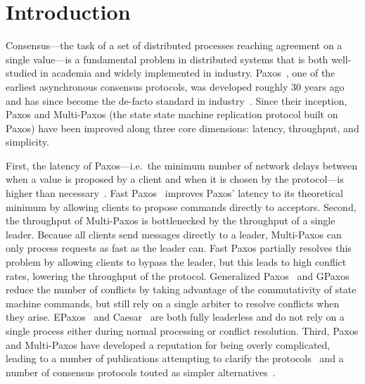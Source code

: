 \section{Introduction}


Consensus---the task of a set of distributed processes reaching agreement on a
single value---is a fundamental problem in distributed systems that is both
well-studied in academia and widely implemented in industry.
Paxos~\cite{lamport1998part}, one of the earliest asynchronous consensus
protocols, was developed roughly 30 years ago and has since become the de-facto
standard in industry~\cite{burrows2006chubby, chandra2007paxos,
baker2011megastore, corbett2013spanner}. Since their inception, Paxos and
Multi-Paxos (the state state machine replication protocol built on Paxos) have
been improved along three core dimensions: latency, throughput, and simplicity.

First, the latency of Paxos---i.e.\ the minimum number of network delays
between when a value is proposed by a client and when it is chosen by the
protocol---is higher than necessary~\cite{lamport2006lower}. Fast
Paxos~\cite{lamport2006fast} improves Paxos' latency to its theoretical minimum
by allowing clients to propose commands directly to acceptors.
%
Second, the throughput of Multi-Paxos is bottlenecked by the throughput of a
single leader. Because all clients send messages directly to a leader,
Multi-Paxos can only process requests as fast as the leader can. Fast Paxos
partially resolves this problem by allowing clients to bypass the leader, but
this leads to high conflict rates, lowering the throughput of the protocol.
Generalized Paxos~\cite{lamport2005generalized} and GPaxos~\cite{sutra2011fast}
reduce the number of conflicts by taking advantage of the commutativity of
state machine commands, but still rely on a single arbiter to resolve conflicts
when they arise. EPaxos~\cite{moraru2013there, moraru2013proof} and
Caesar~\cite{arun2017speeding} are both fully leaderless and do not rely on a
single process either during normal processing or conflict resolution.
%
Third, Paxos and Multi-Paxos have developed a reputation for being overly
complicated, leading to a number of publications attempting to clarify the
protocols~\cite{lamport2001paxos, lampson2001abcd, mazieres2007paxos,
van2015paxos} and a number of consensus protocols touted as simpler
alternatives~\cite{ongaro2014search, rystsov2018caspaxos}.

